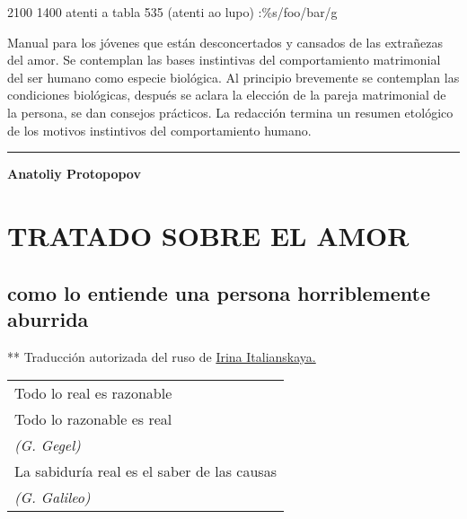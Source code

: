 2100 1400 atenti a tabla 535 (atenti ao lupo) :\%s/foo/bar/g

Manual para los jóvenes que están desconcertados y cansados de las
extrañezas del amor. Se contemplan las bases instintivas del
comportamiento matrimonial del ser humano como especie biológica. Al
principio brevemente se contemplan las condiciones biológicas, después
se aclara la elección de la pareja matrimonial de la persona, se dan
consejos prácticos. La redacción termina un resumen etológico de los
motivos instintivos del comportamiento humano.

\begin{center}\rule{0.5\linewidth}{\linethickness}\end{center}

\textbf{Anatoliy Protopopov}

\section{TRATADO SOBRE EL AMOR}\label{tratado-sobre-el-amor}

\subsection{como lo entiende una persona horriblemente
aburrida}\label{como-lo-entiende-una-persona-horriblemente-aburrida}

** Traducción autorizada del ruso de
\href{mailto:isabel@nubimar.com}{Irina Italianskaya.}

\begin{longtable}[]{@{}l@{}}
\toprule
Todo lo real es razonable\tabularnewline
Todo lo razonable es real\tabularnewline
\emph{(G. Gegel)}\tabularnewline
La sabiduría real es el saber de las causas\tabularnewline
\emph{(G. Galileo)}\tabularnewline
\bottomrule
\end{longtable}

